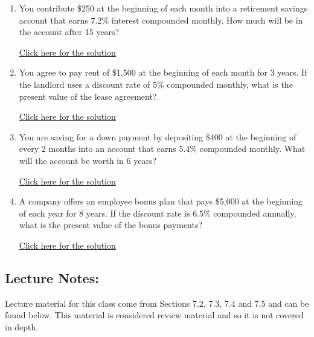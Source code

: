\documentclass[
]{book}
\providecommand{\tightlist}{%
  \setlength{\itemsep}{0pt}\setlength{\parskip}{0pt}}
\begin{document}
\begin{enumerate}
\def\labelenumi{\arabic{enumi}.}
\tightlist
\item
  You contribute \$250 at the beginning of each month into a retirement savings account that earns 7.2\% interest compounded monthly. How much will be in the account after 15 years?

  \href{https://youtu.be/e7x69WQbUy8}{Click here for the solution}
\item
  You agree to pay rent of \$1,500 at the beginning of each month for 3 years. If the landlord uses a discount rate of 5\% compounded monthly, what is the present value of the lease agreement?

  \href{https://youtu.be/VqldJMs4-Oo}{Click here for the solution}
\item
  You are saving for a down payment by depositing \$400 at the beginning of every 2 months into an account that earns 5.4\% compounded monthly. What will the account be worth in 6 years?

  \href{https://youtu.be/DHjYuRYo8JI}{Click here for the solution}
\item
  A company offers an employee bonus plan that pays \$5,000 at the beginning of each year for 8 years. If the discount rate is 6.5\% compounded annually, what is the present value of the bonus payments?

  \href{https://youtu.be/pipYbAzRvG4}{Click here for the solution}
\end{enumerate}

\subsection*{Lecture Notes:}\label{lecture-notes-16}

Lecture material for this class come from Sections 7.2, 7.3, 7.4 and 7.5 and can be found below. This material is considered review material and so it is not covered in depth.
\end{document}
